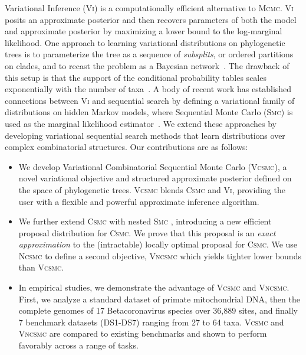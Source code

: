 \documentclass[accepted]{uai2021} %
\theoremstyle{definition}
\begin{document}
Variational Inference (\textsc{Vi}) is a computationally efficient alternative to \textsc{Mcmc}. %
\textsc{Vi} posits an approximate posterior and then recovers parameters of both the model and approximate posterior by maximizing a lower bound to the log-marginal likelihood. One approach to learning variational distributions on phylogenetic trees is to parameterize the tree as a sequence of \textit{subsplits}, or ordered partitions on clades, and to recast the problem as a Bayesian network~\citep{NIPS2018_7418}. The drawback of this setup is that the support of the conditional probability tables scales exponentially with the number of taxa~\citep{zhang2018variational}. A body of recent work has established connections between \textsc{Vi} and sequential search by defining a variational family of distributions on hidden Markov models, where Sequential Monte Carlo (\textsc{Smc}) is used as the marginal likelihood estimator~\citep{maddison2017filtering,anh2018autoencoding,pmlr-v84-naesseth18a,lawson2018twisted,moretti2019smoothing,moretti2019particle,naesseth2020msc,MLCB,moretti2020psvo,Moretti2021}. We extend these approaches by developing variational sequential search methods that learn distributions over complex combinatorial structures.
Our contributions are as follows:
\begin{itemize}
    \item We develop Variational Combinatorial Sequential Monte Carlo (\textsc{Vcsmc}), a novel variational objective and structured approximate posterior defined on the space of phylogenetic trees. \textsc{Vcsmc} blends \textsc{Csmc} and \textsc{Vi}, providing the user with a flexible and powerful approximate inference algorithm.
    \item We further extend \textsc{Csmc} with nested \textsc{Smc} \citep{naesseth2015nested,naesseth2016high}, introducing a new efficient proposal distribution for \textsc{Csmc}.
We prove that this proposal is an \emph{exact approximation} to the (intractable) locally optimal proposal for \textsc{Csmc}. We use \textsc{Ncsmc} to define a second objective, \textsc{Vncsmc} which yields tighter lower bounds than \textsc{Vcsmc}.
\item In empirical studies, we demonstrate the advantage of \textsc{Vcsmc} and \textsc{Vncsmc}. First, we analyze %
a standard dataset of primate mitochondrial DNA, then the complete genomes of 17 Betacoronavirus species over 36,889 sites, and finally 7 benchmark datasets (DS1-DS7) ranging from 27 to 64 taxa. 
\textsc{Vcsmc} and \textsc{Vncsmc} are compared to existing benchmarks 
and shown to perform favorably across a range of tasks.
\end{itemize}
\end{document}
